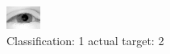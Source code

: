 \begin{figure}[h!]
\begin{center}
\includegraphics[width=0.60\columnwidth]{figures/ID2246_class_1_target_2.png}
\end{center}
\caption{ Classification: 1 actual target: 2}
\label{fig:ID2246_class_1_target_2}
\end{figure}
